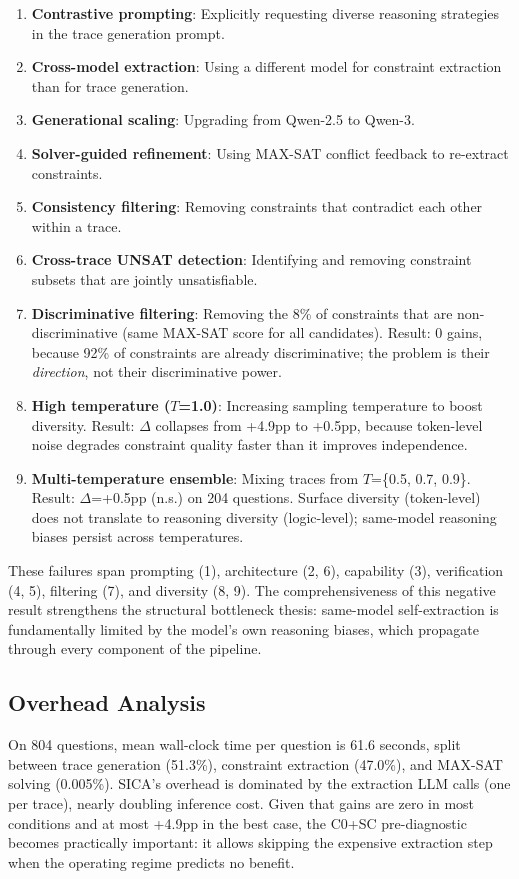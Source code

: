 \documentclass[11pt,a4paper]{article}
\begin{document}
\begin{enumerate}
\item \textbf{Contrastive prompting}: Explicitly requesting diverse reasoning strategies in the trace generation prompt.
\item \textbf{Cross-model extraction}: Using a different model for constraint extraction than for trace generation.
\item \textbf{Generational scaling}: Upgrading from Qwen-2.5 to Qwen-3.
\item \textbf{Solver-guided refinement}: Using MAX-SAT conflict feedback to re-extract constraints.
\item \textbf{Consistency filtering}: Removing constraints that contradict each other within a trace.
\item \textbf{Cross-trace UNSAT detection}: Identifying and removing constraint subsets that are jointly unsatisfiable.
\item \textbf{Discriminative filtering}: Removing the 8\% of constraints that are non-discriminative (same MAX-SAT score for all candidates). Result: 0 gains, because 92\% of constraints are already discriminative; the problem is their \emph{direction}, not their discriminative power.
\item \textbf{High temperature ($T$=1.0)}: Increasing sampling temperature to boost diversity. Result: $\Delta$ collapses from +4.9pp to +0.5pp, because token-level noise degrades constraint quality faster than it improves independence.
\item \textbf{Multi-temperature ensemble}: Mixing traces from $T$=\{0.5, 0.7, 0.9\}. Result: $\Delta$=+0.5pp (n.s.) on 204 questions. Surface diversity (token-level) does not translate to reasoning diversity (logic-level); same-model reasoning biases persist across temperatures.
\end{enumerate}

These failures span prompting (1), architecture (2, 6), capability (3), verification (4, 5), filtering (7), and diversity (8, 9). The comprehensiveness of this negative result strengthens the structural bottleneck thesis: same-model self-extraction is fundamentally limited by the model's own reasoning biases, which propagate through every component of the pipeline.

\subsection{Overhead Analysis}

On 804 questions, mean wall-clock time per question is 61.6 seconds, split between trace generation (51.3\%), constraint extraction (47.0\%), and MAX-SAT solving (0.005\%). SICA's overhead is dominated by the extraction LLM calls (one per trace), nearly doubling inference cost. Given that gains are zero in most conditions and at most +4.9pp in the best case, the C0+SC pre-diagnostic becomes practically important: it allows skipping the expensive extraction step when the operating regime predicts no benefit.
\end{document}
